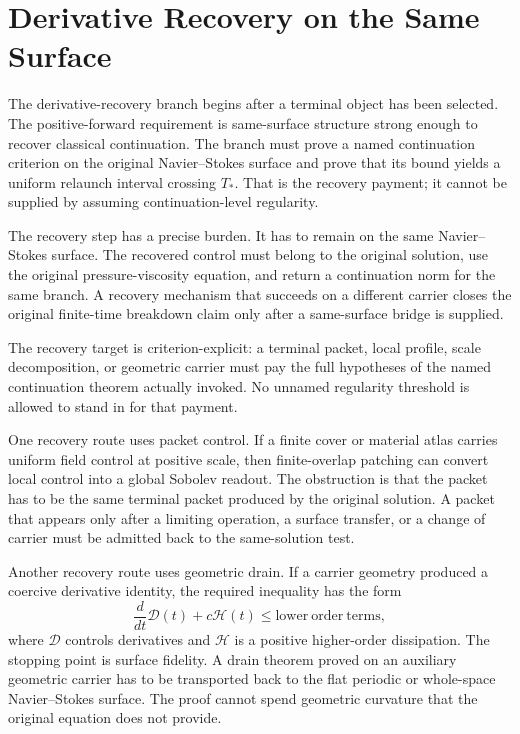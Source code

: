 \section{Derivative Recovery on the Same Surface}
\label{sec:recovery-surface-fidelity-branch}

The derivative-recovery branch begins after a terminal object has been selected.
The positive-forward requirement is same-surface structure strong enough to
recover classical continuation.  The branch must prove a named continuation
criterion on the original Navier--Stokes surface and prove that its bound
yields a uniform relaunch interval crossing \(T_*\).  That is the recovery
payment; it cannot be supplied by assuming continuation-level regularity.

The recovery step has a precise burden. It has to remain on the same
Navier--Stokes surface. The recovered control must belong to the original
solution, use the original pressure-viscosity equation, and return a continuation
norm for the same branch. A recovery mechanism that succeeds on a different
carrier closes the original finite-time breakdown claim only after a same-surface
bridge is supplied.

The recovery target is criterion-explicit: a terminal packet, local profile,
scale decomposition, or geometric carrier must pay the full hypotheses of the
named continuation theorem actually invoked.  No unnamed regularity threshold
is allowed to stand in for that payment.

One recovery route uses packet control. If a finite cover or material atlas
carries uniform field control at positive scale, then finite-overlap patching can
convert local control into a global Sobolev readout. The obstruction is that the
packet has to be the same terminal packet produced by the original solution. A
packet that appears only after a limiting operation, a surface transfer, or a
change of carrier must be admitted back to the same-solution test.

Another recovery route uses geometric drain. If a carrier geometry produced a
coercive derivative identity, the required inequality has the form
\[
  \frac{d}{dt}\mathcal D(t)+c\mathcal H(t)\leq \mathrm{lower\ order\ terms},
\]
where \(\mathcal D\) controls derivatives and \(\mathcal H\) is a positive
higher-order dissipation. The stopping point is surface fidelity. A drain theorem
proved on an auxiliary geometric carrier has to be transported back to the flat
periodic or whole-space Navier--Stokes surface. The proof cannot spend geometric
curvature that the original equation does not provide.

